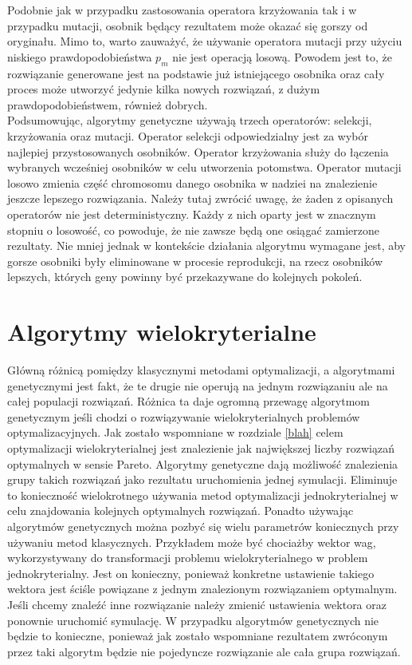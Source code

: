 \documentclass[twoside]{iisthesis}
\begin{document}
Podobnie jak w przypadku zastosowania operatora krzyżowania tak i w przypadku mutacji, osobnik będący rezultatem może okazać się gorszy od oryginału. Mimo to, warto zauważyć, że używanie operatora mutacji przy użyciu niskiego prawdopodobieństwa $p_{m}$ nie jest operacją losową. Powodem jest to, że rozwiązanie generowane jest na podstawie już istniejącego osobnika oraz cały proces może utworzyć jedynie kilka nowych rozwiązań, z dużym prawdopodobieństwem, również dobrych.\\

Podsumowując, algorytmy genetyczne używają trzech operatorów: selekcji, krzyżowania oraz mutacji. Operator selekcji odpowiedzialny jest za wybór najlepiej przystosowanych osobników. Operator krzyżowania służy do łączenia wybranych wcześniej osobników w celu utworzenia potomstwa. Operator mutacji losowo zmienia część chromosomu danego osobnika w nadziei na znalezienie jeszcze lepszego rozwiązania. Należy tutaj zwrócić uwagę, że żaden z opisanych operatorów nie jest deterministyczny. Każdy z nich oparty jest w znacznym stopniu o losowość, co powoduje, że nie zawsze będą one osiągać zamierzone rezultaty. Nie mniej jednak w kontekście działania algorytmu wymagane jest, aby gorsze osobniki były eliminowane w procesie reprodukcji, na rzecz osobników lepszych, których geny powinny być przekazywane do kolejnych pokoleń.
\section{Algorytmy wielokryterialne}
Główną różnicą pomiędzy klasycznymi metodami optymalizacji, a algorytmami genetycznymi jest fakt, że te drugie nie operują na jednym rozwiązaniu ale na całej populacji rozwiązań. Różnica ta daje ogromną przewagę algorytmom genetycznym jeśli chodzi o rozwiązywanie wielokryterialnych problemów optymalizacyjnych. Jak zostało wspomniane w rozdziale \ref{blah} celem optymalizacji wielokryterialnej jest znalezienie jak największej liczby rozwiązań optymalnych w sensie Pareto. Algorytmy genetyczne dają możliwość znalezienia grupy takich rozwiązań jako rezultatu uruchomienia jednej symulacji. Eliminuje to konieczność wielokrotnego używania metod optymalizacji jednokryterialnej w celu znajdowania kolejnych optymalnych rozwiązań. Ponadto używając algorytmów genetycznych można pozbyć się wielu parametrów koniecznych przy używaniu metod klasycznych. Przykładem może być chociażby wektor wag, wykorzystywany do transformacji problemu wielokryterialnego w problem jednokryterialny. Jest on konieczny, ponieważ konkretne ustawienie takiego wektora jest ściśle powiązane z jednym znalezionym rozwiązaniem optymalnym. Jeśli chcemy znaleźć inne rozwiązanie należy zmienić ustawienia wektora oraz ponownie uruchomić symulację. W przypadku algorytmów genetycznych nie będzie to konieczne, ponieważ jak zostało wspomniane rezultatem zwróconym przez taki algorytm będzie nie pojedyncze rozwiązanie ale cała grupa rozwiązań.
\end{document}
